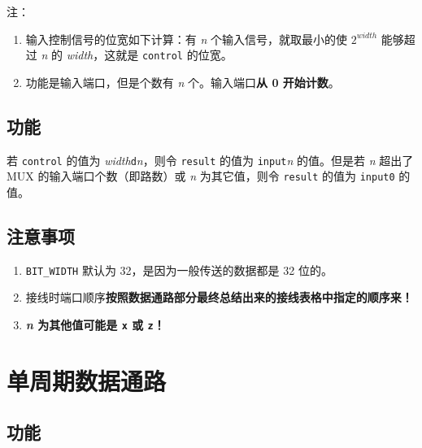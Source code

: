 \documentclass[12pt,AutoFakeBold,AutoFakeSlant]{article}
\providecommand{\tightlist}{%
  \setlength{\itemsep}{0pt}\setlength{\parskip}{0pt}}
\begin{document}
注：

\begin{enumerate}
\def\labelenumi{\arabic{enumi}.}
\tightlist
\item
  输入控制信号的位宽如下计算：有 \emph{n} 个输入信号，就取最小的使
  \emph{$2^{width}$} 能够超过 \emph{n} 的 \emph{width}，这就是
  \texttt{control} 的位宽。
\item
  功能是输入端口，但是个数有 \emph{n} 个。输入端口\textbf{从 0
  开始计数}。
\end{enumerate}

\hypertarget{ux529fux80fd-10}{%
\subsection{功能}\label{ux529fux80fd-10}}

若 \texttt{control} 的值为
\emph{width}\texttt{\textquotesingle{}d}\emph{n}，则令 \texttt{result}
的值为 \texttt{input}\emph{n} 的值。但是若 \emph{n} 超出了 MUX
的输入端口个数（即路数）或 \emph{n} 为其它值，则令 \texttt{result}
的值为 \texttt{input0} 的值。

\hypertarget{ux6ce8ux610fux4e8bux9879-6}{%
\subsection{注意事项}\label{ux6ce8ux610fux4e8bux9879-6}}

\begin{enumerate}
\def\labelenumi{\arabic{enumi}.}
\tightlist
\item
  \texttt{BIT\_WIDTH} 默认为 32，是因为一般传送的数据都是 32 位的。
\item
  接线时端口顺序\textbf{按照数据通路部分最终总结出来的接线表格中指定的顺序来！}
\item
  \textbf{\emph{n} 为其他值可能是 \texttt{x} 或 \texttt{z}！}
\end{enumerate}

\hypertarget{ux5355ux5468ux671fux6570ux636eux901aux8def}{%
\section{单周期数据通路}\label{ux5355ux5468ux671fux6570ux636eux901aux8def}}

\hypertarget{ux529fux80fd-11}{%
\subsection{功能}\label{ux529fux80fd-11}}
\end{document}
